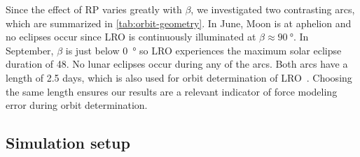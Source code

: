 Since the effect of \gls{RP} varies greatly with $\beta$, we investigated two contrasting arcs, which are summarized in \cref{tab:orbit-geometry}. In June, Moon is at aphelion and no eclipses occur since \gls{LRO} is continuously illuminated at $\beta \approx \qty{90}{\degree}$. In September, $\beta$ is just below \qty{0}{\degree} so \gls{LRO} experiences the maximum solar eclipse duration of \qty{48}{\min}. No lunar eclipses occur during any of the arcs. Both arcs have a length of 2.5 days, which is also used for orbit determination of \gls{LRO}~\cite{Nicholson2010,Mazarico2011}. Choosing the same length ensures our results are a relevant indicator of force modeling error during orbit determination.





\subsection{Simulation setup}
\label{subsec:simulation-setup}


